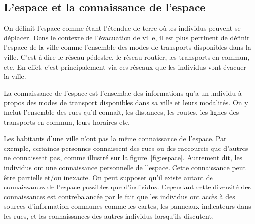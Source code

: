 \documentclass[a4paper]{article}
\begin{document}
\subsection{L'espace et la connaissance de l'espace}

On définit l'espace comme étant l'étendue de terre où les individus peuvent se
déplacer. Dans le contexte de l'évacuation de ville, il est plus pertinent de
définir l'espace de la ville comme l'ensemble des modes de transports
disponibles dans la ville. C'est-à-dire le réseau pédestre, le réseau routier,
les transports en commun, etc. En effet, c'est principalement via ces réseaux
que les individus vont évacuer la ville.

La connaissance de l'espace est l'ensemble des informations qu'a un individu à
propos des modes de transport disponibles dans sa ville et leurs modalités. On y
inclut l'ensemble des rues qu'il connaît, les distances, les routes, les lignes
des transports en commun, leurs horaires etc.

Les habitants d'une ville n'ont pas la même connaissance de l'espace. Par
exemple, certaines personnes connaissent des rues ou des raccourcis que d'autres
ne connaissent pas, comme illustré sur la figure~\ref{fig:espace}. Autrement
dit, les individus ont une connaissance personnelle de l'espace. Cette
connaissance peut être partielle et/ou inexacte. On peut supposer qu'il existe
autant de connaissances de l'espace possibles que d'individus. Cependant cette
diversité des connaissances est contrebalancée par le fait que les individus ont
accès à des sources d'information communes comme les cartes, les panneaux
indicateurs dans les rues, et les connaissances des autres individus lorsqu'ils
discutent.
\end{document}
